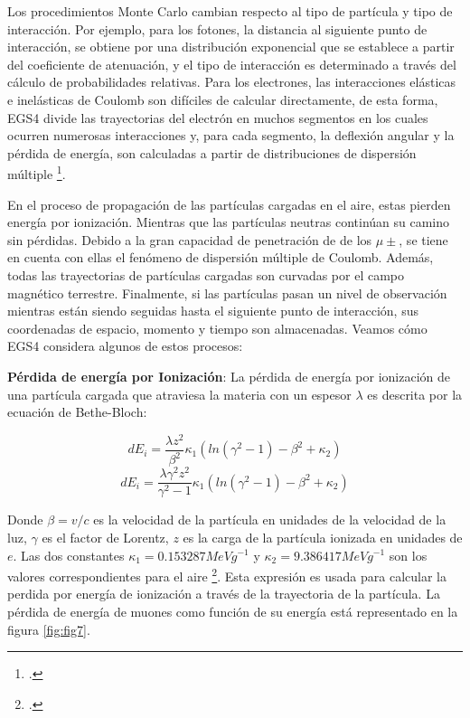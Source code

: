 Los procedimientos Monte Carlo cambian respecto al tipo de partícula y tipo de interacción. Por ejemplo, para los fotones, la distancia al siguiente punto de interacción, se obtiene por una distribución exponencial que se establece a partir del coeficiente de atenuación, y el tipo de interacción es determinado a través del cálculo de probabilidades relativas. Para los electrones, las interacciones elásticas e inelásticas de Coulomb son difíciles de calcular directamente, de esta forma, EGS4 divide las trayectorias del electrón en muchos segmentos en los cuales ocurren numerosas interacciones y, para cada segmento, la deflexión angular y la pérdida de energía, son calculadas a partir de distribuciones de dispersión múltiple \footcite[][154]{EGS4book}.  

En el proceso de propagación de las partículas cargadas en el aire, estas pierden energía por ionización. Mientras que las partículas neutras continúan su camino sin pérdidas. Debido a la gran capacidad de penetración de de los $\mu\pm $, se tiene en cuenta con ellas el fenómeno de dispersión múltiple de Coulomb. Además, todas las trayectorias de partículas cargadas son curvadas por el campo magnético terrestre. Finalmente, si las partículas pasan un nivel de observación mientras están siendo seguidas  hasta el siguiente punto de interacción, sus coordenadas de espacio, momento y tiempo son almacenadas. Veamos cómo EGS4 considera algunos de estos procesos:

\textbf{Pérdida de energía por Ionización}: La pérdida de energía por ionización de una partícula cargada que atraviesa la materia con un espesor $\lambda$ es descrita por la ecuación de Bethe-Bloch:

\begin{equation*}
dE_{i} =  \frac{\lambda z^{2}}{\beta^{2}}\kappa_{1}(ln(\gamma^{2}-1)- \beta^{2}+\kappa_{2})
\end{equation*}
%
\begin{equation}
dE_{i} = \frac{\lambda \gamma^{2}z^{2}}{\gamma^{2}-1}\kappa_{1}(ln(\gamma^{2}-1)- \beta^{2}+\kappa_{2})
\label{eq:eq20}
\end{equation}

Donde $\beta = v/c $ es la velocidad de la partícula en unidades de la velocidad de la luz, $\gamma$ es el factor de Lorentz, $z$ es la carga de la partícula ionizada en unidades de $e$. Las dos constantes $\kappa_{1}= 0.153287 MeV g^{-1}$ y $\kappa_{2}= 9.386417 MeV g^{-1}$ son los valores correspondientes para el aire \footcite[][9]{Heck1998}. Esta expresión es usada para calcular la perdida por energía de ionización a través de la trayectoria de la partícula. La pérdida de energía de muones como función de su energía está representado en la figura \ref{fig:fig7}.

